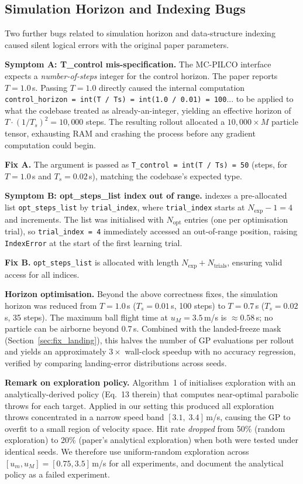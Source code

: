 \subsection{Simulation Horizon and Indexing Bugs}
\label{sec:fix_horizon}

Two further bugs related to simulation horizon and data-structure indexing caused
silent logical errors with the original paper parameters.

\textbf{Symptom A: T\_control mis-specification.}
The MC-PILCO interface expects a \emph{number-of-steps} integer for the control
horizon.
The paper reports $T = 1.0$\,s.
Passing $T = 1.0$ directly caused the internal computation
\texttt{control\_horizon = int(T / Ts) = int(1.0 / 0.01) = 100}... to be applied
to what the codebase treated as already-an-integer, yielding an effective horizon of
$T \cdot (1/T_s)^2 = 10{,}000$ steps.
The resulting rollout allocated a $10{,}000 \times M$ particle tensor, exhausting RAM
and crashing the process before any gradient computation could begin.

\textbf{Fix A.}
The argument is passed as \texttt{T\_control = int(T / Ts) = 50} (steps, for
$T = 1.0$\,s and $T_s = 0.02$\,s), matching the codebase's expected type.

\textbf{Symptom B: opt\_steps\_list index out of range.}
\mcpilco{} indexes a pre-allocated list \texttt{opt\_steps\_list} by
\texttt{trial\_index}, where \texttt{trial\_index} starts at
$N_{\mathrm{exp}} - 1 = 4$ and increments.
The list was initialised with $N_{\mathrm{opt}}$ entries (one per optimisation trial),
so \texttt{trial\_index = 4} immediately accessed an out-of-range position, raising
\texttt{IndexError} at the start of the first learning trial.

\textbf{Fix B.}
\texttt{opt\_steps\_list} is allocated with length
$N_{\mathrm{exp}} + N_{\mathrm{trials}}$, ensuring valid access for all indices.

\textbf{Horizon optimisation.}
Beyond the above correctness fixes, the simulation horizon was reduced from
$T = 1.0$\,s ($T_s = 0.01$\,s, 100 steps) to $T = 0.7$\,s ($T_s = 0.02$\,s,
35 steps).
The maximum ball flight time at $u_M = 3.5$\,m/s is $\approx 0.58$\,s; no particle
can be airborne beyond $0.7$\,s.
Combined with the landed-freeze mask (Section~\ref{sec:fix_landing}), this halves the
number of GP evaluations per rollout and yields an approximately $3\times$ wall-clock
speedup with no accuracy regression, verified by comparing landing-error distributions
across seeds.

\textbf{Remark on exploration policy.}
Algorithm~1 of \cite{turcato2025mcpilot} initialises exploration with an
analytically-derived policy (Eq.~13 therein) that computes near-optimal parabolic
throws for each target.
Applied in our setting this produced all exploration throws concentrated in a narrow
speed band $[3.1,\;3.4]$\,m/s, causing the GP to overfit to a small region of
velocity space.
Hit rate \emph{dropped} from 50\% (random exploration) to 20\% (paper's analytical
exploration) when both were tested under identical seeds.
We therefore use uniform-random exploration across $[u_m, u_M] = [0.75, 3.5]$\,m/s
for all experiments, and document the analytical policy as a failed experiment.
